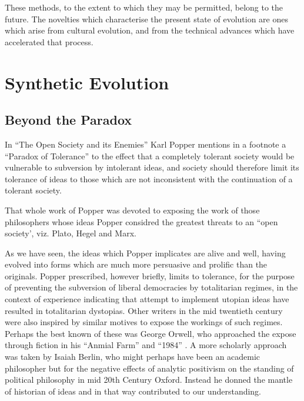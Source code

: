 \documentclass[10pt,titlepage]{book}
\begin{document}
These methods, to the extent to which they may be permitted,  belong to the future.
The novelties which characterise the present state of evolution are ones which arise from cultural evolution, and from the technical advances which have accelerated that process.

\part{Synthetic Evolution}

\chapter{Beyond the Paradox}

In ``The Open Society and its Enemies'' Karl Popper mentions in a footnote a ``Paradox of Tolerance'' to the effect that a completely tolerant society would be vulnerable to subversion by intolerant ideas, and society should therefore limit its tolerance of ideas to those which are not inconsistent with the continuation of a tolerant society.

That whole work of Popper was devoted to exposing the work of those philosophers whose ideas Popper considred the greatest threats to an ``open society', viz. Plato, Hegel and Marx.

As we have seen, the ideas which Popper implicates are alive and well, having evolved into forms which are much more persuasive and prolific than the originals.
Popper prescribed, however briefly, limits to tolerance, for the purpose of preventing the subversion of liberal democracies by totalitarian regimes, in the context of experience indicating that attempt to implement utopian ideas have resulted in totalitarian dystopias.
Other writers in the mid twentieth century were also inspired by similar motives to expose the workings of such regimes.
Perhaps the best known of these was George Orwell, who approached the expose through fiction in his ``Anmial Farm'' and ``1984'' \cite{orwell-af,orwell-1984,orwell-fd}.
A more scholarly approach was taken by Isaiah Berlin, who might perhaps have been an academic philosopher but for the negative effects of analytic positivism on the standing of political philosophy in mid 20th Century Oxford.
Instead he donned the mantle of historian of ideas and in that way contributed to our understanding.
 
\backmatter


{}








\end{document}
